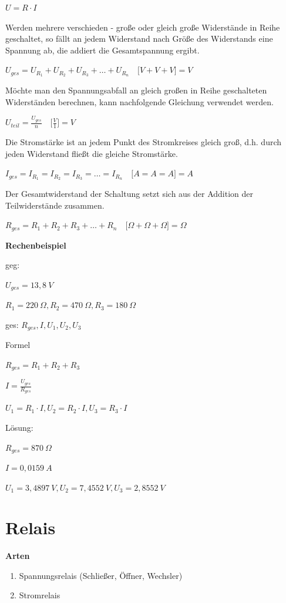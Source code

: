 $\boxed{U = R \cdot I}$

Werden mehrere verschieden - große oder gleich große Widerstände in
Reihe geschaltet, so fällt an jedem Widerstand nach Größe des
Widerstands eine Spannung ab, die addiert die Gesamtspannung ergibt.

$\boxed{U_{ges} = U_{R_1} + U_{R_2} + U_{R_3} + \dots + U_{R_n}} \quad \bigl[V + V + V\bigl] = V$

Möchte man den Spannungsabfall an gleich großen in Reihe geschalteten
Widerständen berechnen, kann nachfolgende Gleichung verwendet werden.

$\boxed{U_{teil} = \frac{U_{ges}}{n}} \quad \bigl[\frac{V}{1}\bigl] = V$

Die Stromstärke ist an jedem Punkt des Stromkreises gleich groß, d.h.
durch jeden Widerstand fließt die gleiche Stromstärke.

$\boxed{I_{ges} = I_{R_1} = I_{R_2} = I_{R_3} = \dots = I_{R_n}} \quad \bigl[A = A = A\bigl] = A$

Der Gesamtwiderstand der Schaltung setzt sich aus der Addition der
Teilwiderstände zusammen.

$\boxed{R_{ges} = R_1 + R_2 + R_3 + \dots + R_n} \quad \bigl[\Omega + \Omega + \Omega\bigl] = \Omega$

\textbf{Rechenbeispiel}

geg:

$U_{ges} = 13,8~V$

$R_1 = 220~\Omega, R_2 = 470~\Omega, R_3 = 180~\Omega$

ges: $R_{ges}, I, U_1, U_2, U_3$

Formel

$R_{ges} = R_1 + R_2 + R_3$

$I = \frac{U_{ges}}{R_{ges}}$

$U_1 = R_1 \cdot I, U_2 = R_2 \cdot I, U_3 = R_3 \cdot I$

Lösung:

$R_{ges} = 870~\Omega$

$I = 0,0159~A$

$U_1 = 3,4897~V, U_2 = 7,4552~V, U_3 = 2,8552~V$

\newpage

\section{Relais}\label{relais}

\textbf{Arten}

\begin{enumerate}
\item
  Spannungsrelais (Schließer, Öffner, Wechsler)
\item
  Stromrelais
\end{enumerate}

